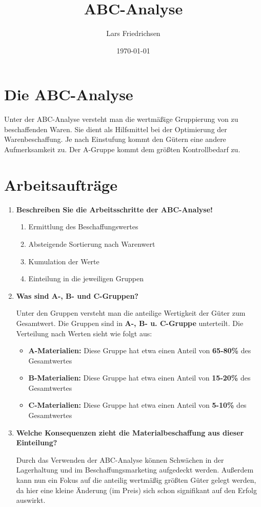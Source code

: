 \documentclass[a4paper,11pt]{scrartcl}	%
\title{ABC-Analyse}
\author{Lars Friedrichsen}
\date{\today}
\begin{document}
\section{Die ABC-Analyse}
Unter der ABC-Analyse versteht man die wertmäßige Gruppierung von zu beschaffenden Waren.
Sie dient als Hilfsmittel bei der Optimierung der Warenbeschaffung. Je nach Einstufung kommt den Gütern eine
andere Aufmerksamkeit zu. Der A-Gruppe kommt dem größten Kontrollbedarf zu.

\section{Arbeitsaufträge}

\begin{enumerate}
	\item \textbf{Beschreiben Sie die Arbeitsschritte der ABC-Analyse!}\par
		\begin{enumerate}
			\item Ermittlung des Beschaffungswertes
			\item Absteigende Sortierung nach Warenwert
			\item Kumulation der Werte
			\item Einteilung in die jeweiligen Gruppen
		\end{enumerate}
	\item \textbf{Was sind A-, B- und C-Gruppen?}\par
	Unter den Gruppen versteht man die anteilige Wertigkeit der Güter zum Gesamtwert. Die Gruppen sind
	in \textbf{A-, B- u. C-Gruppe} unterteilt. Die Verteilung nach Werten sieht wie folgt aus:
		\begin{itemize}
			\item \textbf{A-Materialien:} Diese Gruppe hat etwa einen Anteil von \textbf{65-80\%} des Gesamtwertes
			\item \textbf{B-Materialien:} Diese Gruppe hat etwa einen Anteil von \textbf{15-20\%} des Gesamtwertes
			\item \textbf{C-Materialien:} Diese Gruppe hat etwa einen Anteil von \textbf{5-10\%} des Gesamtwertes
		\end{itemize}
	\item \textbf{Welche Konsequenzen zieht die Materialbeschaffung aus dieser Einteilung?}\par
	Durch das Verwenden der ABC-Analyse können Schwächen in der Lagerhaltung und im Beschaffungsmarketing
	aufgedeckt werden. Außerdem kann nun ein Fokus auf die anteilig wertmäßig größten Güter gelegt werden, da hier 
	eine kleine Änderung (im Preis) sich schon signifikant auf den Erfolg auswirkt.
\end{enumerate}
\end{document}
